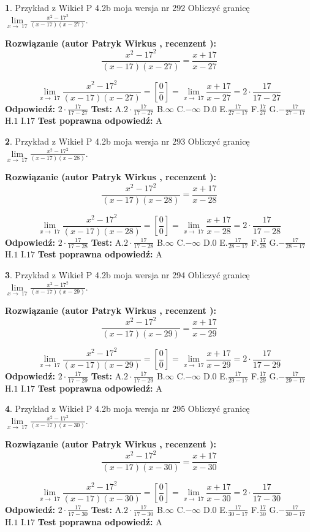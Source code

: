 \documentclass[12pt, a4paper]{article}
\theoremstyle{definition} %
\newtheorem{zad}{}
\newcommand{\zadStart}[1]{\begin{zad}#1\newline}
\newcommand{\zadStop}{\end{zad}}
\newcommand{\rozwStart}[2]{\noindent \textbf{Rozwiązanie (autor #1 , recenzent #2): }\newline}
\newcommand{\rozwStop}{\newline}
\newcommand{\odpStart}{\noindent \textbf{Odpowiedź:}\newline}
\newcommand{\odpStop}{\newline}
\newcommand{\testStart}{\noindent \textbf{Test:}\newline}
\newcommand{\testStop}{\newline}
\newcommand{\kluczStart}{\noindent \textbf{Test poprawna odpowiedź:}\newline}
\newcommand{\kluczStop}{\newline}
\begin{document}
\zadStart{Przykład z Wikieł P 4.2b moja wersja nr 292}
Obliczyć granicę $\lim\limits_{x\to\ 17}\frac{x^{2}-17^{2}}{(x-17)(x-27)}$.
\zadStop
\rozwStart{Patryk Wirkus}{}
$$\frac{x^{2}-17^{2}}{(x-17)(x-27)}=\frac{x+17}{x-27}$$

$$\lim\limits_{x\to\ 17}\frac{x^{2}-17^{2}}{(x-17)(x-27)}=[\frac{0}{0}]=\lim\limits_{x\to\ 17}\frac{x+17}{x-27}=2 \cdot \frac{17}{17-27}$$
\rozwStop
\odpStart
$2 \cdot \frac{17}{17-27}$
\odpStop
\testStart
A.$2 \cdot \frac{17}{17-27}$
B.$\infty$
C.$-\infty$
D.$0$
E.$\frac{17}{27-17}$
F.$\frac{17}{27}$
G.$-\frac{17}{27-17}$
H.$1$
I.$17$
\testStop
\kluczStart
A
\kluczStop



\zadStart{Przykład z Wikieł P 4.2b moja wersja nr 293}
Obliczyć granicę $\lim\limits_{x\to\ 17}\frac{x^{2}-17^{2}}{(x-17)(x-28)}$.
\zadStop
\rozwStart{Patryk Wirkus}{}
$$\frac{x^{2}-17^{2}}{(x-17)(x-28)}=\frac{x+17}{x-28}$$

$$\lim\limits_{x\to\ 17}\frac{x^{2}-17^{2}}{(x-17)(x-28)}=[\frac{0}{0}]=\lim\limits_{x\to\ 17}\frac{x+17}{x-28}=2 \cdot \frac{17}{17-28}$$
\rozwStop
\odpStart
$2 \cdot \frac{17}{17-28}$
\odpStop
\testStart
A.$2 \cdot \frac{17}{17-28}$
B.$\infty$
C.$-\infty$
D.$0$
E.$\frac{17}{28-17}$
F.$\frac{17}{28}$
G.$-\frac{17}{28-17}$
H.$1$
I.$17$
\testStop
\kluczStart
A
\kluczStop



\zadStart{Przykład z Wikieł P 4.2b moja wersja nr 294}
Obliczyć granicę $\lim\limits_{x\to\ 17}\frac{x^{2}-17^{2}}{(x-17)(x-29)}$.
\zadStop
\rozwStart{Patryk Wirkus}{}
$$\frac{x^{2}-17^{2}}{(x-17)(x-29)}=\frac{x+17}{x-29}$$

$$\lim\limits_{x\to\ 17}\frac{x^{2}-17^{2}}{(x-17)(x-29)}=[\frac{0}{0}]=\lim\limits_{x\to\ 17}\frac{x+17}{x-29}=2 \cdot \frac{17}{17-29}$$
\rozwStop
\odpStart
$2 \cdot \frac{17}{17-29}$
\odpStop
\testStart
A.$2 \cdot \frac{17}{17-29}$
B.$\infty$
C.$-\infty$
D.$0$
E.$\frac{17}{29-17}$
F.$\frac{17}{29}$
G.$-\frac{17}{29-17}$
H.$1$
I.$17$
\testStop
\kluczStart
A
\kluczStop



\zadStart{Przykład z Wikieł P 4.2b moja wersja nr 295}
Obliczyć granicę $\lim\limits_{x\to\ 17}\frac{x^{2}-17^{2}}{(x-17)(x-30)}$.
\zadStop
\rozwStart{Patryk Wirkus}{}
$$\frac{x^{2}-17^{2}}{(x-17)(x-30)}=\frac{x+17}{x-30}$$

$$\lim\limits_{x\to\ 17}\frac{x^{2}-17^{2}}{(x-17)(x-30)}=[\frac{0}{0}]=\lim\limits_{x\to\ 17}\frac{x+17}{x-30}=2 \cdot \frac{17}{17-30}$$
\rozwStop
\odpStart
$2 \cdot \frac{17}{17-30}$
\odpStop
\testStart
A.$2 \cdot \frac{17}{17-30}$
B.$\infty$
C.$-\infty$
D.$0$
E.$\frac{17}{30-17}$
F.$\frac{17}{30}$
G.$-\frac{17}{30-17}$
H.$1$
I.$17$
\testStop
\kluczStart
A
\kluczStop
\end{document}
